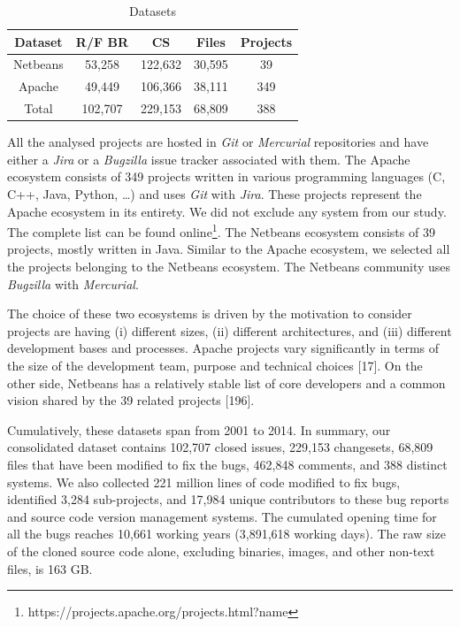 \documentclass[12pt]{report}
\begin{document}
\begin{table}[h]
\begin{center}
\begin{tabular}{@{}c|c|c|c|c@{}}
\textbf{Dataset} & \textbf{R/F BR} & \textbf{CS} & \textbf{Files} & \textbf{Projects} \\ \hline \hline
Netbeans         & 53,258          & 122,632     & 30,595         & 39                \\
Apache           & 49,449          & 106,366     & 38,111         & 349               \\
Total            & 102,707         & 229,153     & 68,809         & 388               \\ \hline \hline

\end{tabular}
\end{center}

\caption{Datasets\label{table:datasets}}
\end{table}

All the analysed projects are hosted in \emph{Git} or \emph{Mercurial}
repositories and have either a \emph{Jira} or a \emph{Bugzilla} issue
tracker associated with them. The Apache ecosystem consists of 349
projects written in various programming languages (C, C++, Java, Python,
\ldots{}) and uses \emph{Git} with \emph{Jira}. These projects represent
the Apache ecosystem in its entirety. We did not exclude any system from
our study. The complete list can be found
online\footnote{https://projects.apache.org/projects.html?name}. The
Netbeans ecosystem consists of 39 projects, mostly written in Java.
Similar to the Apache ecosystem, we selected all the projects belonging
to the Netbeans ecosystem. The Netbeans community uses \emph{Bugzilla}
with \emph{Mercurial}.

The choice of these two ecosystems is driven by the motivation to
consider projects are having (i) different sizes, (ii) different
architectures, and (iii) different development bases and processes.
Apache projects vary significantly in terms of the size of the
development team, purpose and technical choices {[}17{]}. On the other
side, Netbeans has a relatively stable list of core developers and a
common vision shared by the 39 related projects {[}196{]}.

Cumulatively, these datasets span from 2001 to 2014. In summary, our
consolidated dataset contains 102,707 closed issues, 229,153 changesets,
68,809 files that have been modified to fix the bugs, 462,848 comments,
and 388 distinct systems. We also collected 221 million lines of code
modified to fix bugs, identified 3,284 sub-projects, and 17,984 unique
contributors to these bug reports and source code version management
systems. The cumulated opening time for all the bugs reaches 10,661
working years (3,891,618 working days). The raw size of the cloned
source code alone, excluding binaries, images, and other non-text files,
is 163 GB.
\end{document}
